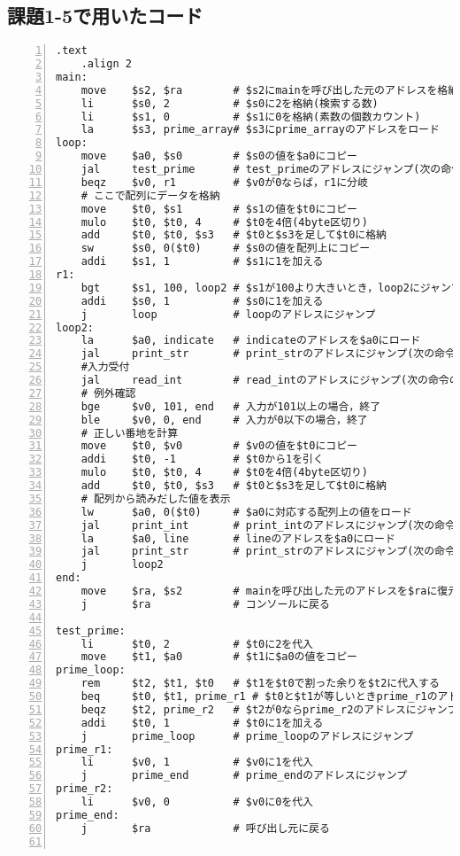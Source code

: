 \subsection{課題1-5で用いたコード} \label{sec:p1-5}
\begin{Verbatim}[numbers=left, xleftmargin=10mm, numbersep=6pt,
                    fontsize=\small, baselinestretch=0.8]
    .text
    .align 2
main:
    move    $s2, $ra        # $s2にmainを呼び出した元のアドレスを格納
    li      $s0, 2          # $s0に2を格納(検索する数)
    li      $s1, 0          # $s1に0を格納(素数の個数カウント)
    la      $s3, prime_array# $s3にprime_arrayのアドレスをロード
loop:
    move    $a0, $s0        # $s0の値を$a0にコピー
    jal     test_prime      # test_primeのアドレスにジャンプ(次の命令のアドレスを$raに)
    beqz    $v0, r1         # $v0が0ならば，r1に分岐
    # ここで配列にデータを格納
    move    $t0, $s1        # $s1の値を$t0にコピー
    mulo    $t0, $t0, 4     # $t0を4倍(4byte区切り)
    add     $t0, $t0, $s3   # $t0と$s3を足して$t0に格納
    sw      $s0, 0($t0)     # $s0の値を配列上にコピー
    addi    $s1, 1          # $s1に1を加える
r1:
    bgt     $s1, 100, loop2 # $s1が100より大きいとき，loop2にジャンプ
    addi    $s0, 1          # $s0に1を加える
    j       loop            # loopのアドレスにジャンプ
loop2:
    la      $a0, indicate   # indicateのアドレスを$a0にロード
    jal     print_str       # print_strのアドレスにジャンプ(次の命令のアドレスを$raに)
    #入力受付
    jal     read_int        # read_intのアドレスにジャンプ(次の命令のアドレスを$raに)
    # 例外確認
    bge     $v0, 101, end   # 入力が101以上の場合，終了
    ble     $v0, 0, end     # 入力が0以下の場合，終了
    # 正しい番地を計算
    move    $t0, $v0        # $v0の値を$t0にコピー
    addi    $t0, -1         # $t0から1を引く
    mulo    $t0, $t0, 4     # $t0を4倍(4byte区切り)
    add     $t0, $t0, $s3   # $t0と$s3を足して$t0に格納
    # 配列から読みだした値を表示
    lw      $a0, 0($t0)     # $a0に対応する配列上の値をロード
    jal     print_int       # print_intのアドレスにジャンプ(次の命令のアドレスを$raに)
    la      $a0, line       # lineのアドレスを$a0にロード
    jal     print_str       # print_strのアドレスにジャンプ(次の命令のアドレスを$raに)
    j       loop2
end:
    move    $ra, $s2        # mainを呼び出した元のアドレスを$raに復元
    j       $ra             # コンソールに戻る

test_prime:
    li      $t0, 2          # $t0に2を代入
    move    $t1, $a0        # $t1に$a0の値をコピー
prime_loop:
    rem     $t2, $t1, $t0   # $t1を$t0で割った余りを$t2に代入する
    beq     $t0, $t1, prime_r1 # $t0と$t1が等しいときprime_r1のアドレスにジャンプ
    beqz    $t2, prime_r2   # $t2が0ならprime_r2のアドレスにジャンプ
    addi    $t0, 1          # $t0に1を加える
    j       prime_loop      # prime_loopのアドレスにジャンプ
prime_r1:
    li      $v0, 1          # $v0に1を代入
    j       prime_end       # prime_endのアドレスにジャンプ
prime_r2:
    li      $v0, 0          # $v0に0を代入
prime_end:
    j       $ra             # 呼び出し元に戻る


\end{Verbatim}
